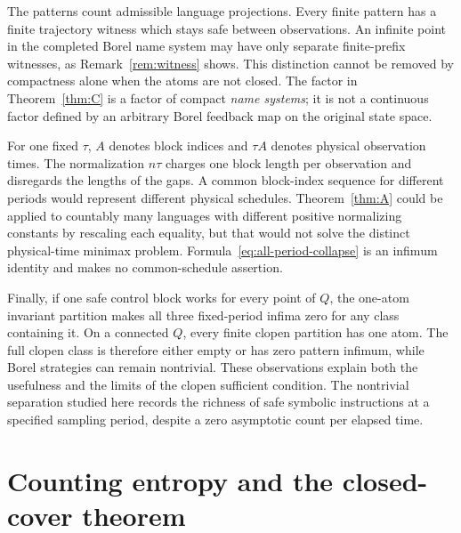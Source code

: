 \documentclass[11pt,reqno]{amsart}
\numberwithin{equation}{section}
\theoremstyle{definition}
\begin{document}
The patterns count admissible language projections. Every finite pattern
has a finite trajectory witness which stays safe between observations.
An infinite point in the completed Borel name system may have only
separate finite-prefix witnesses, as Remark~\ref{rem:witness} shows.
This distinction cannot be removed by compactness alone when the atoms
are not closed. The factor in Theorem~\ref{thm:C} is a factor of compact
\emph{name systems}; it is not a continuous factor defined by an arbitrary
Borel feedback map on the original state space.

For one fixed $\tau$, $A$ denotes block indices and $\tau A$ denotes
physical observation times. The normalization $n\tau$ charges one block
length per observation and disregards the lengths of the gaps. A common
block-index sequence for different periods would represent different
physical schedules. Theorem~\ref{thm:A} could be applied to countably many
languages with different positive normalizing constants by rescaling
each equality, but that would not solve the distinct physical-time
minimax problem. Formula~\eqref{eq:all-period-collapse} is an infimum
identity and makes no common-schedule assertion.

Finally, if one safe control block works for every point of $Q$, the
one-atom invariant partition makes all three fixed-period infima zero
for any class containing it. On a connected $Q$, every finite clopen
partition has one atom. The full clopen class is therefore either empty
or has zero pattern infimum, while Borel strategies can remain
nontrivial. These observations explain both the usefulness and the
limits of the clopen sufficient condition. The nontrivial separation
studied here records the richness of safe symbolic instructions at a
specified sampling period, despite a zero asymptotic count per elapsed
time.

\section{Counting entropy and the closed-cover theorem}
\end{document}
